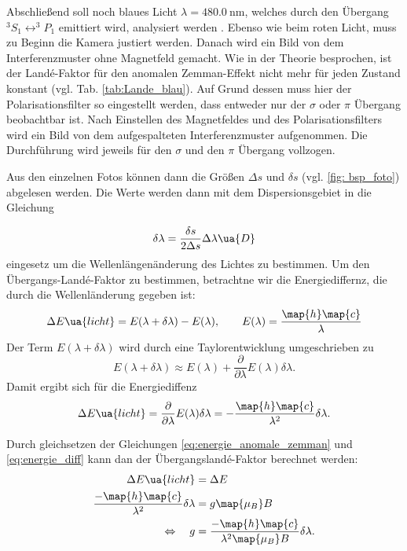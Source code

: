 Abschließend soll noch blaues Licht $\lambda=\SI{480.0}{\nm}$, welches durch den Übergang $^3S_1\leftrightarrow ^3\!\!P_1$ emittiert wird,
analysiert werden \cite{anleitung27}. Ebenso wie beim roten Licht, muss zu Beginn die Kamera justiert werden. %
Danach wird ein Bild von dem Interferenzmuster ohne Magnetfeld gemacht. Wie in der Theorie besprochen, ist der
Landé-Faktor für den anomalen Zemman-Effekt nicht mehr für jeden Zustand konstant (vgl. Tab. \ref{tab:Lande_blau}). Auf Grund dessen muss hier der Polarisationsfilter %
so eingestellt werden, dass entweder nur der $\sigma$ oder $\pi$ Übergang beobachtbar ist. Nach Einstellen des Magnetfeldes
und des Polarisationsfilters wird ein Bild von dem aufgespalteten Interferenzmuster aufgenommen. Die Durchführung wird jeweils %
 für den $\sigma$ und den $\pi$ Übergang vollzogen.

Aus den einzelnen Fotos können dann die Größen $\Delta s$ und $\delta s$ (vgl. \ref{fig: bsp_foto}) abgelesen werden.
Die Werte werden dann mit dem Dispersionsgebiet in die Gleichung

\begin{equation}
  \label{eq: wellen_änderung}
  \delta \lambda=\frac{\delta s}{2\Delta s} \Delta \lambda\ua{D}
\end{equation}
eingesetz um die Wellenlängenänderung des Lichtes zu bestimmen.
Um den Übergangs-Landé-Faktor zu bestimmen, betrachtne wir die Energiediffernz, die durch die Wellenländerung gegeben ist:
\begin{equation*}
  \Delta E\ua{licht}=E(\lambda+\delta\lambda)-E(\lambda),\qquad E(\lambda)=\frac{\map{h}\map{c}}{\lambda}
\end{equation*}
Der Term $E(\lambda+\delta\lambda)$ wird durch eine Taylorentwicklung umgeschrieben zu
\begin{equation*}
  E(\lambda+\delta\lambda)\approx E(\lambda)+\frac{\partial}{\partial \lambda} E(\lambda) \delta \lambda.
\end{equation*}
Damit ergibt sich für die Energiediffenz
\begin{equation}
  \label{eq:energie_diff}
  \Delta E\ua{licht}=\frac{\partial}{\partial \lambda} E(\lambda) \delta \lambda= -\frac{\map{h}\map{c}}{\lambda^2}\delta\lambda.
\end{equation}

Durch gleichsetzen der Gleichungen \eqref{eq:energie_anomale_zemman} und \eqref{eq:energie_diff} kann dan der Übergangslandé-Faktor berechnet werden:
\begin{align}
  \Delta E\ua{licht}&=\Delta E \notag \\
   \frac{-\map{h}\map{c}}{\lambda^2}\delta\lambda & =g\map{\mu_B}B \notag \\
  \Leftrightarrow \quad g&= \frac{-\map{h}\map{c}}{\lambda^2 \map{\mu_B}B}\delta\lambda \label{eq: uebergangs_lande}.
\end{align}
